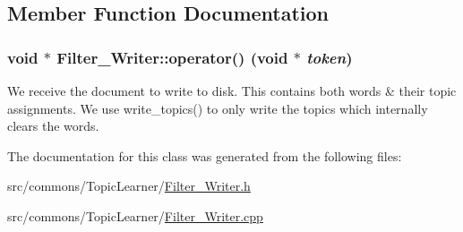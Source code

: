 \subsection{Member Function Documentation}
\hypertarget{class_filter___writer_a54da214300ac51202c3661152155c8ae}{
\subsubsection[{operator()}]{\setlength{\rightskip}{0pt plus 5cm}void $\ast$ Filter\_\-Writer::operator() (void $\ast$ {\em token})}}
\label{class_filter___writer_a54da214300ac51202c3661152155c8ae}
We receive the document to write to disk. This contains both words \& their topic assignments. We use write\_\-topics() to only write the topics which internally clears the words. 

The documentation for this class was generated from the following files:\begin{DoxyCompactItemize}
\item 
src/commons/TopicLearner/\hyperlink{_filter___writer_8h}{Filter\_\-Writer.h}\item 
src/commons/TopicLearner/\hyperlink{_filter___writer_8cpp}{Filter\_\-Writer.cpp}\end{DoxyCompactItemize}
